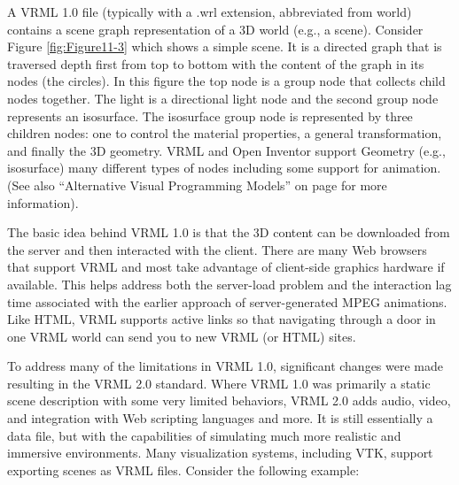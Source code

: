 A VRML 1.0 file (typically with a .wrl extension, abbreviated from world) contains a scene graph representation of a 3D world (e.g., a scene). Consider Figure \ref{fig:Figure11-3} which shows a simple scene. It is a directed graph that is traversed depth first from top to bottom with the content of the graph in its nodes (the circles). In this figure the top node is a group node that collects child nodes together. The light is a directional light node and the second group node represents an isosurface. The isosurface group node is represented by three children nodes: one to control the material properties, a general transformation, and finally the 3D geometry. VRML and Open Inventor support Geometry (e.g., isosurface) many different types of nodes including some support for animation. (See also ``Alternative Visual Programming Models''  on page \pageref{subsec:alternative_visual_programming_models} for more information).

The basic idea behind VRML 1.0 is that the 3D content can be downloaded from the server and then interacted with the client. There are many Web browsers that support VRML and most take advantage of client-side graphics hardware if available. This helps address both the server-load problem and the interaction lag time associated with the earlier approach of server-generated MPEG animations. Like HTML, VRML supports active links so that navigating through a door in one VRML world can send you to new VRML (or HTML) sites.

To address many of the limitations in VRML 1.0, significant changes were made resulting in the VRML 2.0 standard. Where VRML 1.0 was primarily a static scene description with some very limited behaviors, VRML 2.0 adds audio, video, and integration with Web scripting languages and more. It is still essentially a data file, but with the capabilities of simulating much more realistic and immersive environments. Many visualization systems, including VTK, support exporting scenes as VRML files. Consider the following example:

